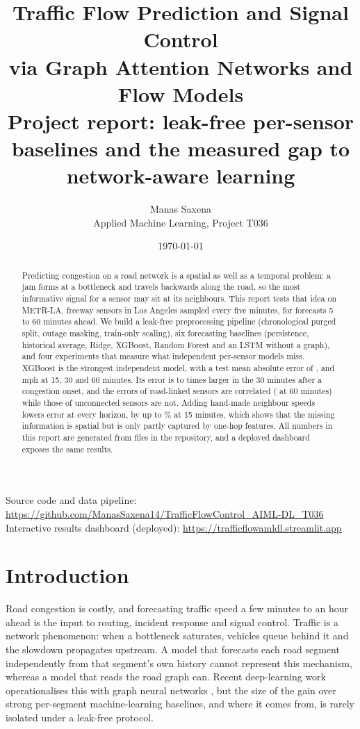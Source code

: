 \documentclass[11pt,a4paper]{article}
\title{\vspace{-1cm}\textbf{Traffic Flow Prediction and Signal Control\\via Graph Attention Networks and Flow Models}\\[6pt]
\large Project report: leak-free per-sensor baselines and the measured gap to network-aware learning}
\author{Manas Saxena\\[2pt]\small Applied Machine Learning, Project T036}
\date{\today}
\newcommand{\dashboard}{\url{https://trafficflowamldl.streamlit.app}}
\newcommand{\repository}{\url{https://github.com/ManasSaxena14/TrafficFlowControl_AIML-DL_T036}}
\begin{document}
\maketitle
\thispagestyle{empty}

\begin{center}
\small
Source code and data pipeline: \repository\\
Interactive results dashboard (deployed): \dashboard
\end{center}

\begin{abstract}
\noindent Predicting congestion on a road network is a spatial as well as a temporal problem: a jam forms at a bottleneck and travels backwards along the road, so the most informative signal for a sensor may sit at its neighbours.
This report tests that idea on METR-LA, \Sensors{} freeway sensors in Los Angeles sampled every five minutes, for forecasts 5 to 60 minutes ahead.
We build a leak-free preprocessing pipeline (chronological purged split, outage masking, train-only scaling), six forecasting baselines (persistence, historical average, Ridge, XGBoost, Random Forest and an LSTM without a graph), and four experiments that measure what independent per-sensor models miss.
XGBoost is the strongest independent model, with a test mean absolute error of \xgbMAEFifteen, \xgbMAEThirty{} and \xgbMAESixty{} mph at 15, 30 and 60 minutes.
Its error is \OnsetRatioFifteen{} to \OnsetRatioThirty{} times larger in the 30 minutes after a congestion onset, and the errors of road-linked sensors are correlated (\ResidLinkSixty{} at 60 minutes) while those of unconnected sensors are not.
Adding hand-made neighbour speeds lowers error at every horizon, by up to \NbGainFifteen\% at 15 minutes, which shows that the missing information is spatial but is only partly captured by one-hop features.
All numbers in this report are generated from files in the repository, and a deployed dashboard exposes the same results.
\end{abstract}

\clearpage
\setcounter{tocdepth}{1}
\tableofcontents
\clearpage

\section{Introduction}
Road congestion is costly, and forecasting traffic speed a few minutes to an hour ahead is the input to routing, incident response and signal control.
Traffic is a network phenomenon: when a bottleneck saturates, vehicles queue behind it and the slowdown propagates upstream.
A model that forecasts each road segment independently from that segment's own history cannot represent this mechanism, whereas a model that reads the road graph can.
Recent deep-learning work operationalises this with graph neural networks \citep{li2018dcrnn,yu2018stgcn,wu2019graphwavenet}, but the size of the gain over strong per-segment machine-learning baselines, and where it comes from, is rarely isolated under a leak-free protocol.
\end{document}
